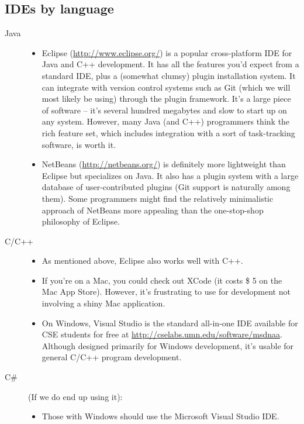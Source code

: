 \documentclass[12pt]{article}
\begin{document}
\subsection{IDEs by language}
\begin{description}
    \item[Java] \hfill
        \begin{itemize}
            \item Eclipse (\url{http://www.eclipse.org/}) is a popular cross-platform IDE for Java and C++ development. It has all the features you'd expect from a standard IDE, plus a (somewhat clumsy) plugin installation system. It can integrate with version control systems such as Git (which we will most likely be using) through the plugin framework. It's a large piece of software -- it's several hundred megabytes and slow to start up on any system. However, many Java (and C++) programmers think the rich feature set, which includes integration with a sort of task-tracking software, is worth it. 
            \item NetBeans (\url{http://netbeans.org/}) is definitely more lightweight than Eclipse but specializes on Java. It also has a plugin system with a large database of user-contributed plugins (Git support is naturally among them). Some programmers might find the relatively minimalistic approach of NetBeans more appealing than the one-stop-shop philosophy of Eclipse.
        \end{itemize}
    \item[C/C++] \hfill
        \begin{itemize}
            \item As mentioned above, Eclipse also works well with C++. 
            \item If you're on a Mac, you could check out XCode (it costs \$ 5 on the Mac App Store). However, it's frustrating to use for development not involving a shiny Mac application. 
            \item On Windows, Visual Studio is the standard all-in-one IDE available for CSE students for free at \url{http://cselabs.umn.edu/software/msdnaa}. Although designed primarily for Windows development, it's usable for general C/C++ program development.
        \end{itemize}
    \item[C\#]
        (If we do end up using it): 
        \begin{itemize}
            \item Those with Windows should use the Microsoft Visual Studio IDE. 

\end{itemize}
\end{description}
\end{document}
